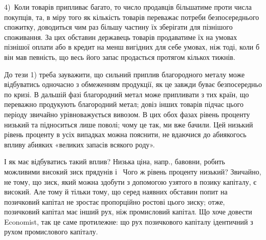 4)~Коли товарів припливає багато, то число продавців більшатиме проти числа покупців, та,
в міру того як кількість товарів переважає потреби безпосереднього спожитку,
доводиться чим раз більшу частину їх зберігати для пізнішого споживання. За цих
обставин державець товарів продаватиме їх на умовах пізнішої оплати або
в кредит на менш вигідних для себе умовах, ніж тоді, коли б він мав певність,
що весь його запас продасться протягом кількох тижнів.

До тези 1) треба зауважити, що сильний приплив благородного металу
може відбуватись одночасно з обмеженням продукції, як це завжди
буває безпосередньо по кризі. В дальшій фазі благородний метал може припливати
з тих країн, що переважно продукують благородний метал; довіз
інших товарів підчас цього періоду звичайно урівноважується вивозом. В цих
обох фазах рівень проценту низький та підноситься лише поволі; чому це так,
ми вже бачили. Цей низький рівень проценту в усіх випадках можна пояснити,
не вдаючися до абиякогось впливу абияких «великих запасів всякого роду».

І як має відбуватись такий вплив? Низька ціна, напр., бавовни, робить можливими
високий зиск прядунів і~ Чого ж рівень проценту низький? Звичайно,
не тому, що зиск, який можна здобути з допомогою узятого в позику
капіталу, є високий. Але тому й тільки тому, що серед наявних обставин попит
на позичковий капітал не зростає пропорційно ростові цього зиску; отже, позичковий
капітал має інший рух, ніж промисловий капітал. Що хоче довести
Economist, так це саме протилежне: що рух позичкового капіталу ідентичний
з рухом промислового капіталу.

